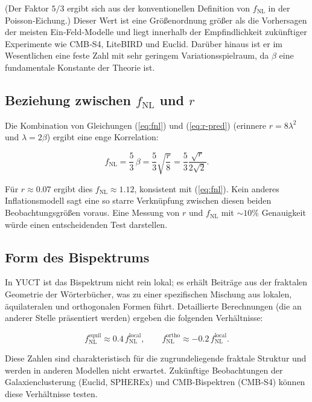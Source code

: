 \documentclass[12pt]{article}
\theoremstyle{remark}
\begin{document}
	(Der Faktor $5/3$ ergibt sich aus der konventionellen Definition von $f_{\text{NL}}$ in der Poisson‑Eichung.) Dieser Wert ist eine Größenordnung größer als die Vorhersagen der meisten Ein‑Feld‑Modelle und liegt innerhalb der Empfindlichkeit zukünftiger Experimente wie CMB‑S4, LiteBIRD und Euclid. Darüber hinaus ist er im Wesentlichen eine feste Zahl mit sehr geringem Variationsspielraum, da $\beta$ eine fundamentale Konstante der Theorie ist.
	
	\subsection{Beziehung zwischen $f_{\text{NL}}$ und $r$}
	
	Die Kombination von Gleichungen (\ref{eq:fnl}) und (\ref{eq:r-pred}) (erinnere $r = 8\lambda^2$ und $\lambda = 2\beta$) ergibt eine enge Korrelation:
	
	\begin{equation}
		f_{\text{NL}} = \frac{5}{3}\,\beta = \frac{5}{3}\sqrt{\frac{r}{8}} = \frac{5}{3}\frac{\sqrt{r}}{2\sqrt{2}}.
		\label{eq:fnl-r}
	\end{equation}
	
	Für $r \approx 0.07$ ergibt dies $f_{\text{NL}} \approx 1.12$, konsistent mit (\ref{eq:fnl}). Kein anderes Inflationsmodell sagt eine so starre Verknüpfung zwischen diesen beiden Beobachtungsgrößen voraus. Eine Messung von $r$ und $f_{\text{NL}}$ mit $\sim 10\%$ Genauigkeit würde einen entscheidenden Test darstellen.
	
	\subsection{Form des Bispektrums}
	
	In YUCT ist das Bispektrum nicht rein lokal; es erhält Beiträge aus der fraktalen Geometrie der Wörterbücher, was zu einer spezifischen Mischung aus lokalen, äquilateralen und orthogonalen Formen führt. Detaillierte Berechnungen (die an anderer Stelle präsentiert werden) ergeben die folgenden Verhältnisse:
	
	\begin{equation}
		f_{\text{NL}}^{\text{equil}} \approx 0.4\, f_{\text{NL}}^{\text{local}}, \qquad
		f_{\text{NL}}^{\text{ortho}} \approx -0.2\, f_{\text{NL}}^{\text{local}}.
		\label{eq:fnl-shapes}
	\end{equation}
	
	Diese Zahlen sind charakteristisch für die zugrundeliegende fraktale Struktur und werden in anderen Modellen nicht erwartet. Zukünftige Beobachtungen der Galaxienclusterung (Euclid, SPHEREx) und CMB‑Bispektren (CMB‑S4) können diese Verhältnisse testen.
	
\end{document}
